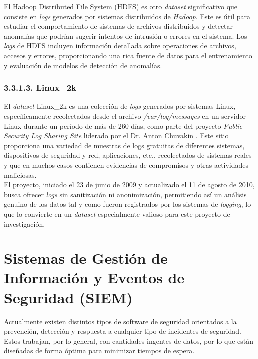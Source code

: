 El Hadoop Distributed File System (\gls{HDFS}) es otro \textit{dataset} significativo que consiste en \textit{logs} generados por sistemas distribuidos de \textit{Hadoop}. Este es útil para estudiar el comportamiento de sistemas de archivos distribuidos y detectar anomalías que podrían sugerir intentos de intrusión o errores en el sistema. Los \textit{logs} de \gls{HDFS} incluyen información detallada sobre operaciones de archivos, accesos y errores, proporcionando una rica fuente de datos para el entrenamiento y evaluación de modelos de detección de anomalías.

\subsubsection{3.3.1.3.  Linux\_2k} \label{Linux_2k}

El \textit{dataset} Linux\_2k es una colección de \textit{logs} generados por sistemas Linux, específicamente recolectados desde el archivo \textit{/var/log/messages} en un servidor Linux durante un período de más de 260 días, como parte del proyecto \textit{Public Security Log Sharing Site} liderado por el Dr. Anton Chuvakin \cite{chuvakin2010public}. Este sitio proporciona una variedad de muestras de logs gratuitas de diferentes sistemas, dispositivos de seguridad y red, aplicaciones, etc., recolectados de sistemas reales y que en muchos casos contienen evidencias de compromisos y otras actividades maliciosas. \\

El proyecto, iniciado el 23 de junio de 2009 y actualizado el 11 de agosto de 2010, busca ofrecer \textit{logs} sin sanitización ni anonimización, permitiendo así un análisis genuino de los datos tal y como fueron registrados por los sistemas de \textit{logging}, lo que lo convierte en un \textit{dataset} especialmente valioso para este proyecto de investigación.

\newpage


\section[SIEM]{Sistemas de Gestión de Información y Eventos de Seguridad (SIEM)}

Actualmente existen distintos tipos de software de seguridad orientados a la prevención, detección y respuesta a cualquier tipo de incidentes de seguridad. Estos trabajan, por lo general, con cantidades ingentes de datos, por lo que están diseñadas de forma óptima para minimizar tiempos de espera. 

